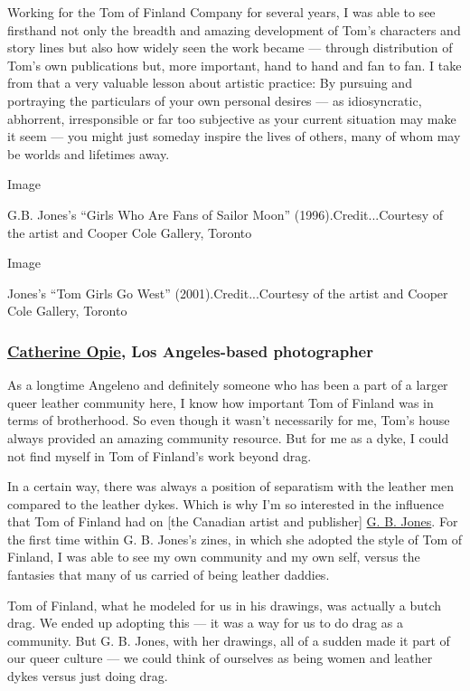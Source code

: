 Working for the Tom of Finland Company for several years, I was able to
see firsthand not only the breadth and amazing development of Tom's
characters and story lines but also how widely seen the work became ---
through distribution of Tom's own publications but, more important, hand
to hand and fan to fan. I take from that a very valuable lesson about
artistic practice: By pursuing and portraying the particulars of your
own personal desires --- as idiosyncratic, abhorrent, irresponsible or
far too subjective as your current situation may make it seem --- you
might just someday inspire the lives of others, many of whom may be
worlds and lifetimes away.

Image

G.B. Jones's ``Girls Who Are Fans of Sailor Moon''
(1996).Credit...Courtesy of the artist and Cooper Cole Gallery, Toronto

Image

Jones's ``Tom Girls Go West'' (2001).Credit...Courtesy of the artist and
Cooper Cole Gallery, Toronto

\hypertarget{catherine-opie-los-angeles-based-photographer}{%
\subsubsection{\texorpdfstring{\textbf{\href{https://www.nytimes.com/2019/10/02/t-magazine/catherine-opie.html}{Catherine
Opie}, Los Angeles-based
photographer}}{Catherine Opie, Los Angeles-based photographer}}\label{catherine-opie-los-angeles-based-photographer}}

As a longtime Angeleno and definitely someone who has been a part of a
larger queer leather community here, I know how important Tom of Finland
was in terms of brotherhood. So even though it wasn't necessarily for
me, Tom's house always provided an amazing community resource. But for
me as a dyke, I could not find myself in Tom of Finland's work beyond
drag.

In a certain way, there was always a position of separatism with the
leather men compared to the leather dykes. Which is why I'm so
interested in the influence that Tom of Finland had on {[}the Canadian
artist and publisher{]}
\href{https://coopercolegallery.com/artist/g-b-jones/}{G. B. Jones}. For
the first time within G. B. Jones's zines, in which she adopted the
style of Tom of Finland, I was able to see my own community and my own
self, versus the fantasies that many of us carried of being leather
daddies.

Tom of Finland, what he modeled for us in his drawings, was actually a
butch drag. We ended up adopting this --- it was a way for us to do drag
as a community. But G. B. Jones, with her drawings, all of a sudden made
it part of our queer culture --- we could think of ourselves as being
women and leather dykes versus just doing drag.

